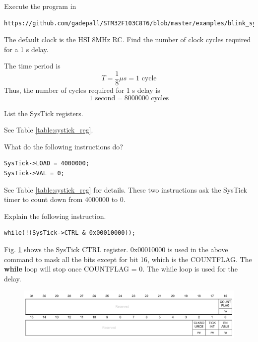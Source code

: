 \documentclass[journal,12pt,twocolumn]{IEEEtran}
\begin{document}
\begin{problem}
Execute the program in 
\begin{lstlisting}
https://github.com/gadepall/STM32F103C8T6/blob/master/examples/blink_systick.c
\end{lstlisting}
\end{problem}
\begin{problem}
The default clock is the HSI 8MHz RC.  Find the number of clock cycles required for a 1 s delay.
\end{problem}
\solution The time period is
\begin{equation}
T = \frac{1}{8}\mu s = 1 \text{ cycle}
\end{equation}
Thus, the number of cycles required for 1 s delay is
\begin{equation}
1 \text{ second} = 8000000 \text{ cycles}
\end{equation}
\begin{problem}
List the SysTick registers.
\end{problem}
\solution See Table \ref{table:systick_reg}.
\begin{table}[!h]
\footnotesize

\caption{}
\label{table:systick_reg}
\end{table}
\begin{problem}
What do the following instructions do?
\begin{lstlisting}
SysTick->LOAD = 4000000;
SysTick->VAL = 0;
\end{lstlisting}
\end{problem}
\solution See Table \ref{table:systick_reg} for details.  These two instructions ask the SysTick timer to count down from 4000000 to 0.  
\begin{problem}
Explain the following instruction.
\begin{lstlisting}
while(!(SysTick->CTRL & 0x00010000));
\end{lstlisting}
\end{problem}
\solution Fig. \ref{fig:systick_ctrl} shows the SysTick CTRL register.    0x00010000 is used in the above command to mask all the bits except for bit 16, which
is the COUNTFLAG.  The \textbf{while} loop will stop once COUNTFLAG = 0. The while loop is used for the delay.
\begin{figure}[!h]
\begin{center}
\includegraphics[width=\columnwidth]{./figs/systick_ctrl}
\end{center}
\caption{}
\label{fig:systick_ctrl}
\end{figure}
\end{document}
